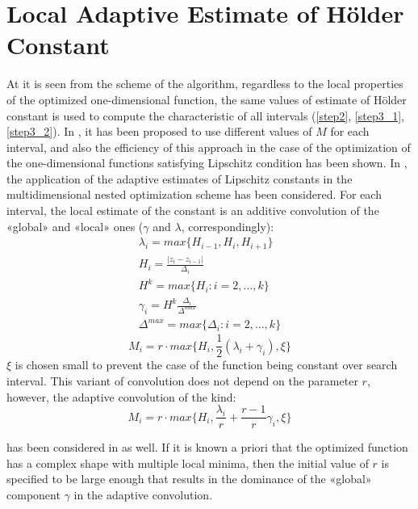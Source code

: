 \documentclass[procedia]{easychair}
\begin{document}
\section{Local Adaptive Estimate of Hölder Constant}
At it is seen from the scheme of the algorithm, regardless to the local properties
of the optimized one-dimensional function, the same values of estimate of Hölder
constant is used to compute the characteristic of all intervals (\ref{step2}, \ref{step3_1}, \ref{step3_2}).
In \cite{sergLocalTuning}, it has been proposed to use different values of \(M\) for each interval,
and also the efficiency of this approach in the case of the optimization of the
one-dimensional functions satisfying Lipschitz condition has been shown. In \cite{nestedLocal},
the application of the adaptive estimates of Lipschitz constants in the multidimensional
nested optimization scheme has been considered. For each interval, the local estimate of the
constant is an additive convolution of the «global» and «local» ones (\(\gamma\) and \(\lambda\), correspondingly):
\begin{displaymath}
  \begin{array}{lr}
    \lambda_i=max\{H_{i-1},H_i,H_{i+1}\} \\
    H_i=\frac{|z_i-z_{i-1}|}{\Delta_i} \\
    H^k=max\{H_i:i=2,\dots ,k\} \\
    \gamma_i=H^k\frac{\Delta_i}{\Delta^{max}} \\
    \Delta^{max}=max\{\Delta_{i}:i=2,\dots ,k\}
  \end{array}
\end{displaymath}
\begin{equation}
\label{additiveConv}
M_i=r\cdot max\{H_i, \frac{1}{2}(\lambda_i+\gamma_i),\xi\}
\end{equation}
\(\xi\) is chosen small to prevent the case of the function being constant over search interval.
This variant of convolution does not depend on the parameter \(r\), however, the adaptive convolution of the kind:
\begin{equation}
\label{additiveAdaptiveConv}
M_i=r\cdot max\{H_i, \frac{\lambda_i}{r}+\frac{r-1}{r}\gamma_i,\xi\}
\end{equation}
\par
has been considered in \cite{sergLocalTuning} as well.
If it is known a priori that the optimized function has a complex shape with multiple
local minima, then the initial value of \(r\) is specified to be large enough that
results in the dominance of the «global» component \(\gamma\) in the adaptive convolution.
\end{document}

